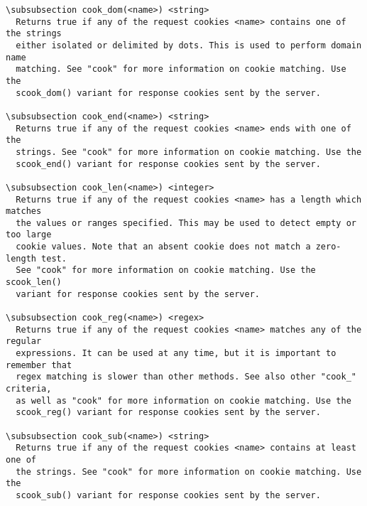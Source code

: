 \begin{verbatim}
\subsubsection cook_dom(<name>) <string>
  Returns true if any of the request cookies <name> contains one of the strings
  either isolated or delimited by dots. This is used to perform domain name
  matching. See "cook" for more information on cookie matching. Use the
  scook_dom() variant for response cookies sent by the server.

\subsubsection cook_end(<name>) <string>
  Returns true if any of the request cookies <name> ends with one of the
  strings. See "cook" for more information on cookie matching. Use the
  scook_end() variant for response cookies sent by the server.

\subsubsection cook_len(<name>) <integer>
  Returns true if any of the request cookies <name> has a length which matches
  the values or ranges specified. This may be used to detect empty or too large
  cookie values. Note that an absent cookie does not match a zero-length test.
  See "cook" for more information on cookie matching. Use the scook_len()
  variant for response cookies sent by the server.

\subsubsection cook_reg(<name>) <regex>
  Returns true if any of the request cookies <name> matches any of the regular
  expressions. It can be used at any time, but it is important to remember that
  regex matching is slower than other methods. See also other "cook_" criteria,
  as well as "cook" for more information on cookie matching. Use the
  scook_reg() variant for response cookies sent by the server.

\subsubsection cook_sub(<name>) <string>
  Returns true if any of the request cookies <name> contains at least one of
  the strings. See "cook" for more information on cookie matching. Use the
  scook_sub() variant for response cookies sent by the server.


\end{verbatim}
